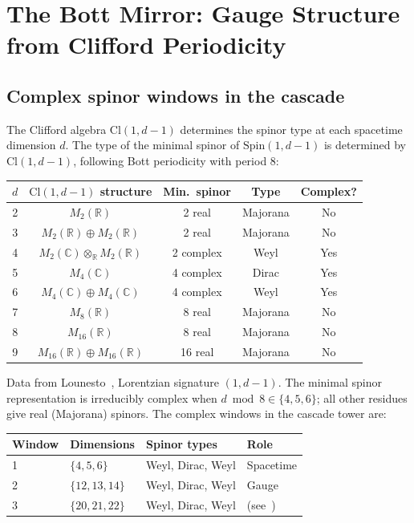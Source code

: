 \documentclass[12pt,a4paper]{article}
\begin{document}
\section{The Bott Mirror: Gauge Structure from Clifford Periodicity}\label{sec:bott-mirror}

\subsection{Complex spinor windows in the cascade}

The Clifford algebra $\mathrm{Cl}(1,d-1)$ determines the spinor type at each spacetime
dimension $d$. The type of the minimal spinor of $\mathrm{Spin}(1,d-1)$ is determined by
$\mathrm{Cl}(1,d-1)$, following Bott periodicity with period 8:

\begin{center}
\begin{tabular}{ccccc}
\toprule
$d$ & $\mathrm{Cl}(1,d-1)$ structure & Min.\ spinor & Type & Complex? \\
\midrule
2 & $M_2(\mathbb{R})$ & 2 real & Majorana & No \\
3 & $M_2(\mathbb{R})\oplus M_2(\mathbb{R})$ & 2 real & Majorana & No \\
4 & $M_2(\mathbb{C})\otimes_{\mathbb{R}}M_2(\mathbb{R})$ & 2 complex & Weyl & Yes \\
5 & $M_4(\mathbb{C})$ & 4 complex & Dirac & Yes \\
6 & $M_4(\mathbb{C})\oplus M_4(\mathbb{C})$ & 4 complex & Weyl & Yes \\
7 & $M_8(\mathbb{R})$ & 8 real & Majorana & No \\
8 & $M_{16}(\mathbb{R})$ & 8 real & Majorana & No \\
9 & $M_{16}(\mathbb{R})\oplus M_{16}(\mathbb{R})$ & 16 real & Majorana & No \\
\bottomrule
\end{tabular}
\end{center}

Data from Lounesto~\cite{lounesto}, Lorentzian signature $(1,d-1)$. The minimal spinor
representation is irreducibly complex when $d\bmod 8\in\{4,5,6\}$; all other residues give
real (Majorana) spinors. The complex windows in the cascade tower are:

\begin{center}
\begin{tabular}{llll}
\toprule
Window & Dimensions & Spinor types & Role \\
\midrule
1 & $\{4,5,6\}$   & Weyl, Dirac, Weyl & Spacetime \\
2 & $\{12,13,14\}$ & Weyl, Dirac, Weyl & Gauge \\
3 & $\{20,21,22\}$ & Weyl, Dirac, Weyl & (see~\cite{part4b}) \\
\bottomrule
\end{tabular}
\end{center}
\end{document}
